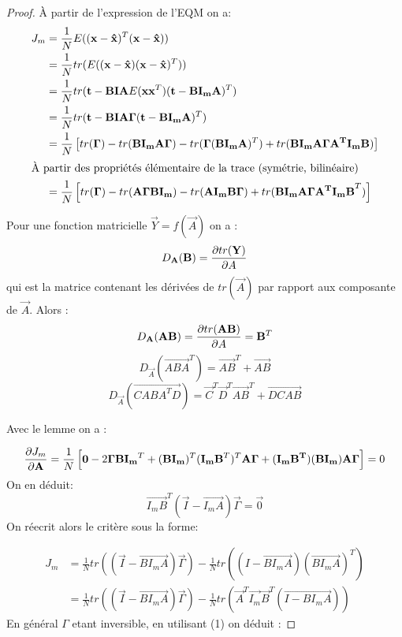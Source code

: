 \documentclass[main.tex]{subfiles}
\begin{document}
\begin{proof}
  
  À partir de l'expression de l'EQM on a:
  \begin{align*}
J_m & = \frac{1}{N}E((\vec{x}-\vec{\hat{x}})^T(\vec{x}-\vec{\hat{x}}))                                                \\
    & = \frac{1}{N} tr(E((\vec{x}-\vec{\hat{x}})(\vec{x}-\vec{\hat{x}})^T))                                           \\
    & = \frac{1}{N} tr(\vec{t}-\vec{BIA}E(\vec{xx}^T)(\vec{t}-\vec{BI_mA})^T)                                         \\
    & = \frac{1}{N} tr(\vec{t}-\vec{BIA}\vec{\Gamma}(\vec{t}-\vec{BI_mA})^T)                                               \\
    & = \frac{1}{N} \left[tr(\vec{\Gamma}) - tr(\vec{BI_mA\Gamma})- tr(\vec{\Gamma}(\vec{BI_mA})^T)+tr(\vec{BI_mA\Gamma A^TI_mB}) \right] \\
    \intertext{À partir des propriétés élémentaire de la trace (symétrie, bilinéaire)}
    & = \frac{1}{N}\left[tr(\vec{\Gamma})- tr(\vec{A\Gamma B I_m}) - tr(\vec{AI_mB\Gamma}) + tr(\vec{BI_mA\Gamma A^TI_mB}^T)\right]
    \end{align*}

    \begin{lemme}

      Pour une fonction matricielle $\vec{Y} =  f(\vec{A}) $ on a :
      \[
        D_{\vec{A}}(\vec{B}) =\derivp[tr(\vec{Y})]{A}
      \]
      qui est la matrice contenant les dérivées de $tr(\vec{A})$  par rapport aux composante de $\vec{A}$. Alors :
      \[
        D_{\vec{A}}(\vec{AB}) = \derivp[tr(\vec{AB})]{A}= \vec{B}^T
      \]
      \[
        D_{\vec{A}}(\vec{ABA}^T) = \vec{AB}^T+\vec{AB}
      \]
      \[
        D_{\vec{A}}(\vec{CABA^TD}) = \vec{C}^T\vec{D}^T\vec{AB}^T+\vec{DCAB}
      \]
    \end{lemme}
    Avec le lemme on a :

    \begin{align*}
      \derivp[J_m]{\vec{A}} = \frac{1}{N}\left[
      \vec{0} - 2\vec{\Gamma BI_m}^T+ (\vec{BI_m})^T(\vec{I_mB}^T)^T\vec{A}\vec{\Gamma}+(\vec{I_mB^T})(\vec{BI_m})\vec{A\Gamma} \right]=0
    \end{align*}
    On en déduit:
    \[
      \vec{I_mB}^T(\vec{I}-\vec{I_mA})\vec{\Gamma} = \vec{0} \tag{(1)}
    \]
    On réecrit alors le critère sous la forme:

      \begin{align*}
        J_m &= \frac{1}{N} tr((\vec{I}-\vec{BI_mA})\vec{\Gamma}) - \frac{1}{N}tr((I-\vec{BI_mA})(\vec{BI_mA})^T) \\
            &= \frac{1}{N} tr((\vec{I}-\vec{BI_mA})\vec{\Gamma}) - \frac{1}{N} tr(\vec{A}^T\vec{I_m}\vec{B}^T(\vec{I-BI_mA}))
      \end{align*}
      En général $\Gamma$ etant inversible, en utilisant (1) on déduit :


\end{proof}
\end{document}
